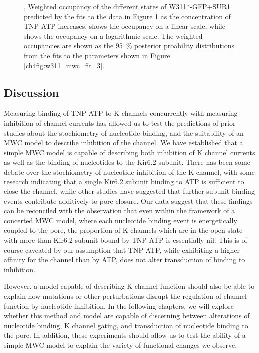 \begin{figure}[h]
\begin{subfigure}[t]{0.45\textwidth}
	\end{subfigure}
	\caption[Comparing the states and weights of concerted and independent models]{
	,  Weighted occupancy of the different states of W311*-GFP+SUR1 predicted by the fits to the data in Figure \ref{ch4fig:w311_model_comparison} as the concentration of TNP-ATP increases.
	 shows the occupancy on a linear scale, while  shows the occupancy on a logarithmic scale.
	The weighted occupancies are shown as the \SI{95}{\percent} posterior proability distributions from the fits to the parameters shown in Figure \ref{ch4fig:w311_mwc_fit_3}.
	}\label{ch4fig:w311_model_comparison}
\end{figure}

\subsection{Discussion}

Measuring binding of TNP-ATP to K\ATP{} channels concurrently with measuring inhibition of channel currents has allowed us to test the predictions of prior studies about the stochiometry of nucleotide binding, and the suitability of an MWC model to describe inhibition of the channel.
We have established that a simple MWC model is capable of describing both inhibition of K\ATP{} channel currents as well as the binding of nucleotides to the Kir6.2 subunit.
There has been some debate over the stochiometry of nucleotide inhibition of the K\ATP{} channel, with some research indicating that a single Kir6.2 subunit binding to ATP is sufficient to close the channel, while other studies have suggested that further subunit binding events contribute additively to pore closure.
Our data suggest that these findings can be reconciled with the observation that even within the framework of a concerted MWC model, where each nucleotide binding event is energetically coupled to the pore, the proportion of K\ATP{} channels which are in the open state with more than Kir6.2 subunit bound by TNP-ATP is essentially nil.
This is of course caveated by our assumption that TNP-ATP, while exhibiting a higher affinity for the channel than by ATP, does not alter transduction of binding to inhibition.

However, a model capable of describing K\ATP{} channel function should also be able to explain how mutations or other perturbations disrupt the regulation of channel function by nucleotide inhibition.
In the following chapters, we will explore whether this method and model are capable of discerning between alterations of nucleotide binding, K\ATP{} channel gating, and transduction of nucleotide binding to the pore.
In addition, these experiments should allow us to test the ability of a simple MWC model to explain the variety of functional changes we observe.